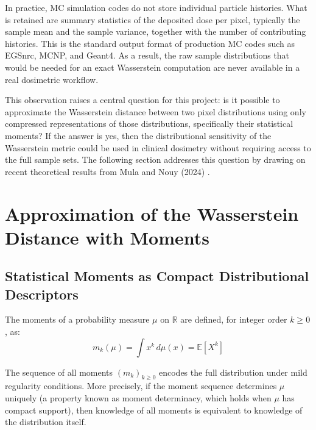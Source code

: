 \documentclass[12pt]{article}
\begin{document}
In practice, MC simulation codes do not store individual particle histories. What is
retained are summary statistics of the deposited dose per pixel, typically the sample
mean and the sample variance, together with the number of contributing histories.
This is the standard output format of production MC codes such as EGSnrc, MCNP, and
Geant4. As a result, the raw sample distributions that would be needed for an exact
Wasserstein computation are never available in a real dosimetric workflow.

This observation raises a central question for this project: is it possible to
approximate the Wasserstein distance between two pixel distributions using only
compressed representations of those distributions, specifically their statistical
moments? If the answer is yes, then the distributional sensitivity of the Wasserstein
metric could be used in clinical dosimetry without requiring access to the full
sample sets. The following section addresses this question by drawing on recent
theoretical results from Mula and Nouy (2024) \cite{mula2024}.


\section{Approximation of the Wasserstein Distance with Moments}

\subsection{Statistical Moments as Compact Distributional Descriptors}

The moments of a probability measure $\mu$ on $\mathbb{R}$ are defined, for integer
order $k \geq 0$, as:
\begin{equation}
    m_k(\mu) = \int x^k \, d\mu(x) = \mathbb{E}[X^k]
\end{equation}

The sequence of all moments $(m_k)_{k \geq 0}$ encodes the full distribution under
mild regularity conditions. More precisely, if the moment sequence determines $\mu$
uniquely (a property known as moment determinacy, which holds when $\mu$ has compact
support), then knowledge of all moments is equivalent to knowledge of the distribution
itself.
\end{document}
